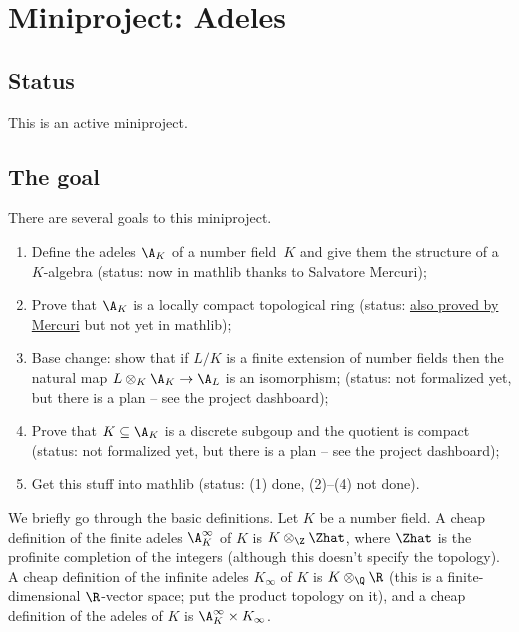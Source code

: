 \chapter{Miniproject: Adeles}\label{Adele_miniproject}

\section{Status}

This is an active miniproject.

\section{The goal}

There are several goals to this miniproject.

\begin{enumerate}
  \item Define the adeles $\A_K$ of a number field~$K$ and
    give them the structure of a $K$-algebra (status: now in mathlib thanks to
    Salvatore Mercuri);
  \item Prove that $\A_K$ is a locally compact topological ring (status:
      \href{https://github.com/smmercuri/adele-ring_locally-compact}{
      also proved by Mercuri} but not yet in mathlib);
  \item Base change: show that if $L/K$ is a finite extension of number fields then the
    natural map $L\otimes_K\A_K\to\A_L$ is an isomorphism; (status: not
    formalized yet, but there is a plan -- see the project dashboard);
  \item Prove that $K \subseteq \A_K$ is a discrete subgoup and the quotient
    is compact (status: not formalized yet, but there is a plan -- see the project
    dashboard);
  \item Get this stuff into mathlib (status: (1) done, (2)--(4) not done).
\end{enumerate}

We briefly go through the basic definitions. Let $K$ be a number field.
A cheap definition of the finite
adeles $\A_K^\infty$ of $K$ is $K\otimes_{\Z}\Zhat$, where $\Zhat$ is
the profinite completion of the integers (although this doesn't specify the topology).
A cheap definition of the infinite adeles
$K_\infty$ of $K$ is $K\otimes_{\Q}\R$ (this is a finite-dimensional $\R$-vector space;
put the product topology on it), and a cheap definition of the adeles
of $K$ is $\A_K^\infty\times K_\infty$.

